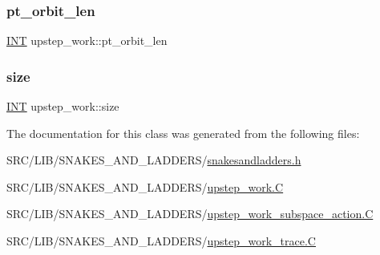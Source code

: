 \mbox{\label{classupstep__work_aded3e43b11eb95c55dbb757f3c05526d}} 
\subsubsection{\texorpdfstring{pt\+\_\+orbit\+\_\+len}{pt\_orbit\_len}}
{\footnotesize\ttfamily \mbox{\hyperlink{galois_8h_a09fddde158a3a20bd2dcadb609de11dc}{I\+NT}} upstep\+\_\+work\+::pt\+\_\+orbit\+\_\+len}

\mbox{\label{classupstep__work_af18b0e9289fb421db595ad553f274746}} 
\subsubsection{\texorpdfstring{size}{size}}
{\footnotesize\ttfamily \mbox{\hyperlink{galois_8h_a09fddde158a3a20bd2dcadb609de11dc}{I\+NT}} upstep\+\_\+work\+::size}



The documentation for this class was generated from the following files\+:\begin{DoxyCompactItemize}
\item 
S\+R\+C/\+L\+I\+B/\+S\+N\+A\+K\+E\+S\+\_\+\+A\+N\+D\+\_\+\+L\+A\+D\+D\+E\+R\+S/\mbox{\hyperlink{snakesandladders_8h}{snakesandladders.\+h}}\item 
S\+R\+C/\+L\+I\+B/\+S\+N\+A\+K\+E\+S\+\_\+\+A\+N\+D\+\_\+\+L\+A\+D\+D\+E\+R\+S/\mbox{\hyperlink{upstep__work_8_c}{upstep\+\_\+work.\+C}}\item 
S\+R\+C/\+L\+I\+B/\+S\+N\+A\+K\+E\+S\+\_\+\+A\+N\+D\+\_\+\+L\+A\+D\+D\+E\+R\+S/\mbox{\hyperlink{upstep__work__subspace__action_8_c}{upstep\+\_\+work\+\_\+subspace\+\_\+action.\+C}}\item 
S\+R\+C/\+L\+I\+B/\+S\+N\+A\+K\+E\+S\+\_\+\+A\+N\+D\+\_\+\+L\+A\+D\+D\+E\+R\+S/\mbox{\hyperlink{upstep__work__trace_8_c}{upstep\+\_\+work\+\_\+trace.\+C}}\end{DoxyCompactItemize}
